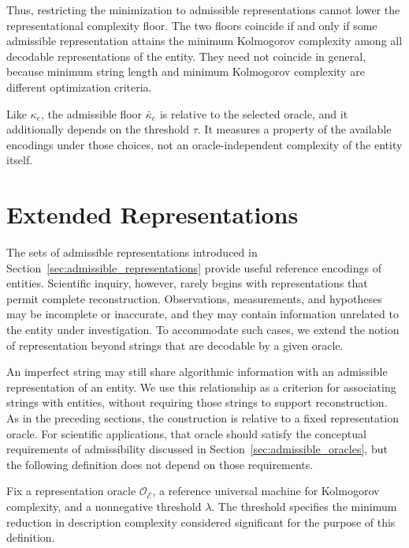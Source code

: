 Thus, restricting the minimization to admissible representations cannot lower the representational complexity floor. The two floors coincide if and only if some admissible representation attains the minimum Kolmogorov complexity among all decodable representations of the entity. They need not coincide in general, because minimum string length and minimum Kolmogorov complexity are different optimization criteria.

Like $\kappa_e$, the admissible floor $\bar\kappa_e$ is relative to the selected oracle, and it additionally depends on the threshold $\tau$. It measures a property of the available encodings under those choices, not an oracle-independent complexity of the entity itself.

%
% 

\section{Extended Representations}
\label{sec:extended_representations}

The sets of admissible representations introduced in Section~\ref{sec:admissible_representations} provide useful reference encodings of entities. Scientific inquiry, however, rarely begins with representations that permit complete reconstruction. Observations, measurements, and hypotheses may be incomplete or inaccurate, and they may contain information unrelated to the entity under investigation. To accommodate such cases, we extend the notion of representation beyond strings that are decodable by a given oracle.

An imperfect string may still share algorithmic information with an admissible representation of an entity. We use this relationship as a criterion for associating strings with entities, without requiring those strings to support reconstruction. As in the preceding sections, the construction is relative to a fixed representation oracle. For scientific applications, that oracle should satisfy the conceptual requirements of admissibility discussed in Section~\ref{sec:admissible_oracles}, but the following definition does not depend on those requirements.

Fix a representation oracle $\mathcal O_{\mathcal E}$, a reference universal machine for Kolmogorov complexity, and a nonnegative threshold $\lambda$. The threshold specifies the minimum reduction in description complexity considered significant for the purpose of this definition.

